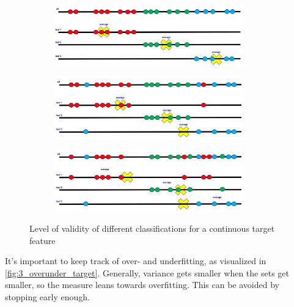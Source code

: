 \begin{figure}[h]
  \centering
  \begin{subfigure}{0.5\textwidth}
    \centering
    \includegraphics[width=0.9\textwidth]{assets/trees/cont/target_good.png}
  \end{subfigure}

  \vspace*{0.5cm}
  \begin{subfigure}{0.5\textwidth}
    \centering
    \includegraphics[width=0.9\textwidth]{assets/trees/cont/target_ok.png}
  \end{subfigure}

  \vspace*{0.5cm}
  \begin{subfigure}{0.5\textwidth}
    \centering
    \includegraphics[width=0.9\textwidth]{assets/trees/cont/target_bad.png}
  \end{subfigure}
  \caption{Level of validity of different classifications for a continuous target feature}
  \label{fig:3_classifications_target}
\end{figure}

It's important to keep track of over- and underfitting, as visualized in \ref{fig:3_overunder_target}. Generally, variance gets smaller when the sets get smaller, so the measure leans towards overfitting. This can be avoided by stopping early enough.

